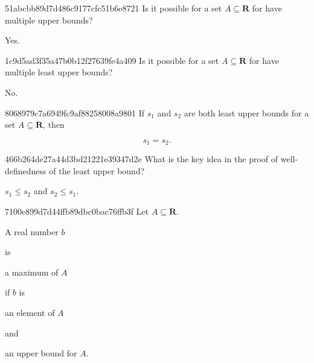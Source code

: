 \begin{note}{51abcbb89d7d486c9177cfc51b6e8721}
    Is it possible for a set \({ A \subseteq \mathbf{R} }\) for have multiple upper bounds?

    \begin{cloze}{1}
        Yes.
    \end{cloze}
\end{note}

\begin{note}{1c9d5ad3f35a47b0b12f27639fe4a409}
    Is it possible for a set \({ A \subseteq \mathbf{R} }\) for have multiple least upper bounds?

    \begin{cloze}{1}
        No.
    \end{cloze}
\end{note}

\begin{note}{8068979c7a6949fc9af88258008a9801}
    If \({ s_1 }\) and \({ s_2 }\) are both least upper bounds for a set \({ A \subseteq \mathbf{R} }\), then
    \begin{icloze}{1}
        \[
            s_1 = s_2.
        \]
    \end{icloze}
\end{note}

\begin{note}{466b264de27a44d3bd21221e39347d2e}
    What is the key idea in the proof of well-definedness of the least upper bound?

    \begin{cloze}{1}
        \({ s_1 \leqslant s_2 }\) and \({ s_2 \leqslant s_1 }\).
    \end{cloze}
\end{note}

\begin{note}{7100e899d7d44ffb89dbc0bac76ffb3f}
    Let \({ A \subseteq \mathbf{R} }\). \begin{icloze}{4}A real number \({ b }\)\end{icloze} is \begin{icloze}{3}a maximum of \({ A }\)\end{icloze} if \({ b }\) is \begin{icloze}{2}an element of \({ A }\)\end{icloze} and \begin{icloze}{1}an upper bound for \({ A }\).\end{icloze}
\end{note}

